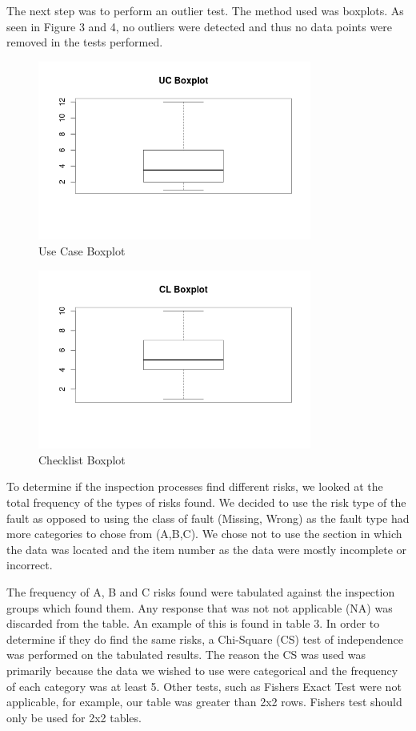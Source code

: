 \documentclass[10pt,twocolumn]{article}
\begin{document}
The next step was to perform an outlier test. The method used was boxplots. As seen in Figure 3 and 4, no outliers were detected and thus no data points were removed in the tests performed. 

\begin{figure}[ht]
\centering
\includegraphics[width=90mm]{uc_box.png}
\caption{Use Case Boxplot}
\end{figure}

\begin{figure}[ht]
\centering
\includegraphics[width=90mm]{cl_box.png}
\caption{Checklist Boxplot}
\end{figure}



To determine if the inspection processes find different risks, we looked at the total frequency of the types of risks found. We decided to use the risk type of the fault as opposed to using the class of fault (Missing, Wrong) as the fault type had more categories to chose from (A,B,C). We chose not to use the section in which the data was located and the item number as the data were mostly incomplete or incorrect.

The frequency of A, B and C risks found were tabulated against the inspection groups which found them. Any response that was not not applicable (NA) was discarded from the table. An example of this is found in table 3. In order to determine if they do find the same risks, a Chi-Square (CS) test of independence was performed on the tabulated results. The reason the CS was used was primarily because the data we wished to use were categorical and the frequency of each category was at least 5. Other tests, such as Fishers Exact Test were not applicable, for example, our table was greater than 2x2 rows. Fishers test should only be used for 2x2 tables.
\end{document}
